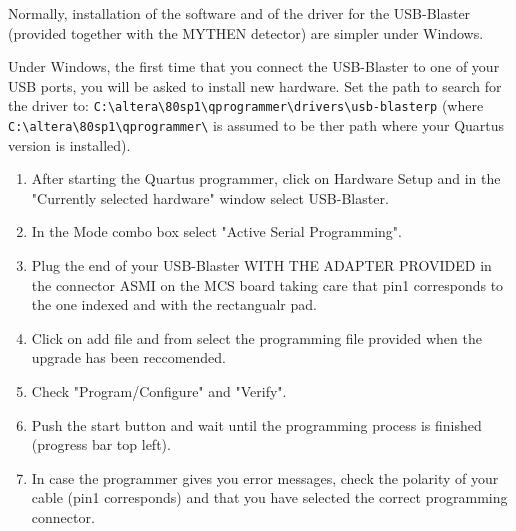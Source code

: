 \documentclass{article}
\begin{document}
\noindent Normally, installation of the software and of the driver for the
USB-Blaster (provided together with the MYTHEN detector) are simpler under
Windows. 


Under Windows, the first time that you connect the USB-Blaster to one
of your USB ports, you will be asked to install new hardware. Set the path to
search for the driver to:
\verb=C:\altera\80sp1\qprogrammer\drivers\usb-blasterp= (where 
\verb=C:\altera\80sp1\qprogrammer\= is assumed to be ther path where your
Quartus version is installed).
\begin{enumerate}
\item After starting the Quartus programmer, click on Hardware Setup and in the
"Currently selected hardware" window select USB-Blaster.
\item In the Mode combo box select "Active Serial Programming".
\item Plug the end of your USB-Blaster WITH THE ADAPTER PROVIDED in the
connector ASMI on the MCS board taking care that pin1 corresponds to the one
indexed and with the rectangualr pad.
\item Click on add file and from select the programming file provided when
the upgrade has been reccomended.
\item Check "Program/Configure" and "Verify".
\item Push the start button and wait until the programming process is
finished (progress bar top left).
\item In case the programmer gives you error messages, check the polarity of
your cable (pin1 corresponds) and that you have selected the correct programming
connector.
\end{enumerate}
\end{document}
